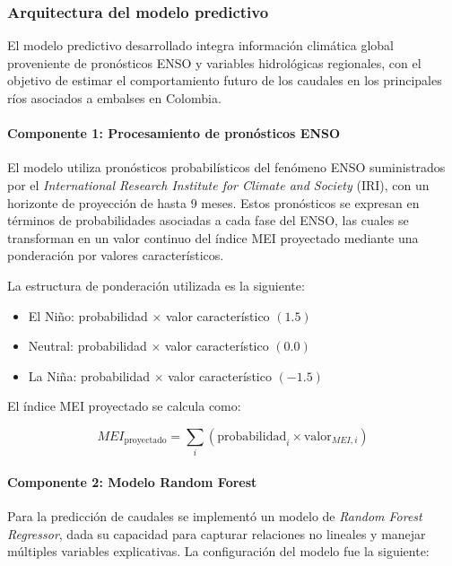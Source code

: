 \subsubsection{Arquitectura del modelo predictivo}

El modelo predictivo desarrollado integra información climática global proveniente de pronósticos ENSO y variables hidrológicas regionales, con el objetivo de estimar el comportamiento futuro de los caudales en los principales ríos asociados a embalses en Colombia.

\paragraph{Componente 1: Procesamiento de pronósticos ENSO}

El modelo utiliza pronósticos probabilísticos del fenómeno ENSO suministrados por el \textit{International Research Institute for Climate and Society} (IRI), con un horizonte de proyección de hasta 9 meses. Estos pronósticos se expresan en términos de probabilidades asociadas a cada fase del ENSO, las cuales se transforman en un valor continuo del índice MEI proyectado mediante una ponderación por valores característicos.

La estructura de ponderación utilizada es la siguiente:

\begin{itemize}
    \item El Niño: probabilidad $\times$ valor característico $(1.5)$
    \item Neutral: probabilidad $\times$ valor característico $(0.0)$
    \item La Niña: probabilidad $\times$ valor característico $(-1.5)$
\end{itemize}

El índice MEI proyectado se calcula como:

\begin{equation}
MEI_{\text{proyectado}} = \sum_{i} \left( \text{probabilidad}_i \times \text{valor}_{MEI,i} \right)
\end{equation}

\paragraph{Componente 2: Modelo Random Forest}

Para la predicción de caudales se implementó un modelo de \textit{Random Forest Regressor}, dada su capacidad para capturar relaciones no lineales y manejar múltiples variables explicativas. La configuración del modelo fue la siguiente:

